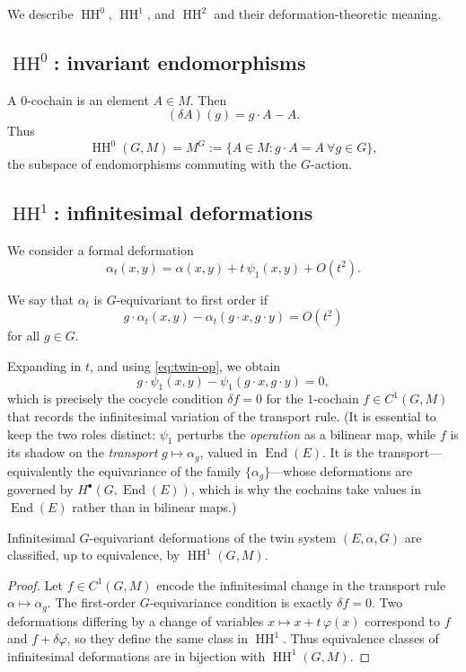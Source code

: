 \documentclass[11pt,a4paper]{article}
\numberwithin{equation}{section}
\DeclareMathOperator{\End}{End}
\DeclareMathOperator{\HH}{HH}
\newcommand{\TwinSpace}{(E,\alpha,G)}
\newcommand{\Cochain}{C}
\newcommand{\diff}{\delta}
\begin{document}
	We describe $\HH^0$, $\HH^1$, and $\HH^2$ and their deformation-theoretic meaning.
	
	\subsection{$\HH^0$: invariant endomorphisms}
	
	A $0$-cochain is an element $A\in M$. Then
	\[
	(\diff A)(g) = g\cdot A - A.
	\]
	Thus
	\[
	\HH^0(G,M) = M^G := \{A\in M : g\cdot A = A\ \forall g\in G\},
	\]
	the subspace of endomorphisms commuting with the $G$-action.
	
	\subsection{$\HH^1$: infinitesimal deformations}
	
	We consider a formal deformation
	\[
	\alpha_t(x,y) = \alpha(x,y) + t\,\psi_1(x,y) + O(t^2).
	\]
	
	\begin{definition}
		We say that $\alpha_t$ is $G$-equivariant to first order if
		\[
		g\cdot \alpha_t(x,y) - \alpha_t(g\cdot x,g\cdot y) = O(t^2)
		\]
		for all $g\in G$.
	\end{definition}
	
	Expanding in $t$, and using \eqref{eq:twin-op}, we obtain
	\[
	g\cdot\psi_1(x,y) - \psi_1(g\cdot x,g\cdot y) = 0,
	\]
	which is precisely the cocycle condition $\diff f=0$ for the $1$-cochain $f\in \Cochain^1(G,M)$ that
	records the infinitesimal variation of the transport rule. (It is essential to keep the two roles
	distinct: $\psi_1$ perturbs the \emph{operation} as a bilinear map, while $f$ is its shadow on the
	\emph{transport} $g\mapsto\alpha_g$, valued in $\End(E)$. It is the transport---equivalently the
	equivariance of the family $\{\alpha_g\}$---whose deformations are governed by $H^\bullet(G,\End(E))$,
	which is why the cochains take values in $\End(E)$ rather than in bilinear maps.)
	
	\begin{theorem}\label{thm:HH1-deformations}
		Infinitesimal $G$-equivariant deformations of the twin system $\TwinSpace$ are classified,
		up to equivalence, by $\HH^1(G,M)$.
	\end{theorem}
	
	\begin{proof}
		Let $f\in \Cochain^1(G,M)$ encode the infinitesimal change in the transport rule
		$\alpha\mapsto \alpha_g$. The first-order $G$-equivariance condition is exactly $\diff f=0$.
		Two deformations differing by a change of variables
		$x\mapsto x + t\,\varphi(x)$ correspond to $f$ and $f+\diff\varphi$, so they define the same
		class in $\HH^1$. Thus equivalence classes of infinitesimal deformations are in bijection with
		$\HH^1(G,M)$.
	\end{proof}
	
\end{document}
